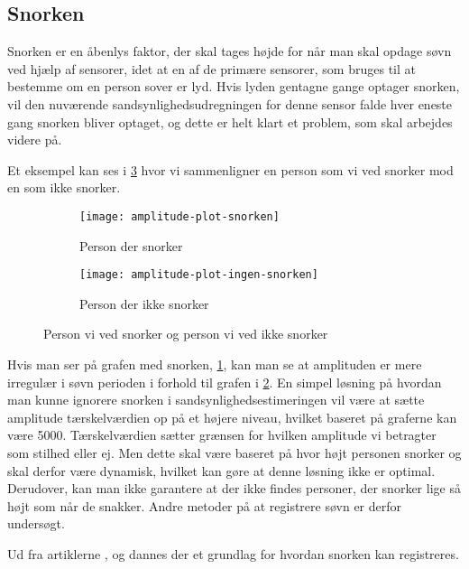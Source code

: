 \subsection{Snorken}\label{section:snorken}
Snorken er en åbenlys faktor, der skal tages højde for når man skal opdage søvn ved hjælp af sensorer, idet at en af de primære sensorer, som bruges til at bestemme om en person sover er lyd.
Hvis lyden gentagne gange optager snorken, vil den nuværende sandsynlighedsudregningen for denne sensor falde hver eneste gang snorken bliver optaget, og dette er helt klart et problem, som skal arbejdes videre på.

Et eksempel kan ses i \cref{fig:snorke-vs-ikkesnorken} hvor vi sammenligner en person som vi ved snorker mod en som ikke snorker.

\begin{figure}[h]
\begin{subfigure}{0.49\textwidth}
\texttt{[image: amplitude-plot-snorken]}
\caption{Person der snorker}
\label{fig:person-snorker}
\end{subfigure}
\begin{subfigure}{0.49\textwidth}
\texttt{[image: amplitude-plot-ingen-snorken]}
\caption{Person der ikke snorker}
\label{fig:person-ikke-snorker}
\end{subfigure}
\caption{Person vi ved snorker og person vi ved ikke snorker}
\label{fig:snorke-vs-ikkesnorken}
\end{figure}

Hvis man ser på grafen med snorken, \cref{fig:person-snorker}, kan man se at amplituden er mere irregulær i søvn perioden i forhold til grafen i \cref{fig:person-ikke-snorker}. 
En simpel løsning på hvordan man kunne ignorere snorken i sandsynlighedsestimeringen vil være at sætte amplitude tærskelværdien op på et højere niveau, hvilket baseret på graferne kan være 5000. 
Tærskelværdien sætter grænsen for hvilken amplitude vi betragter som stilhed eller ej.
Men dette skal være baseret på hvor højt personen snorker og skal derfor være dynamisk, hvilket kan gøre at denne løsning ikke er optimal. 
Derudover, kan man ikke garantere at der ikke findes personer, der snorker lige så højt som når de snakker.
Andre metoder på at registrere søvn er derfor undersøgt.

Ud fra artiklerne \citet{Dafna2013}, \citet{Calabrese20111101} og \citet{7051338} dannes der et grundlag for hvordan snorken kan registreres.

